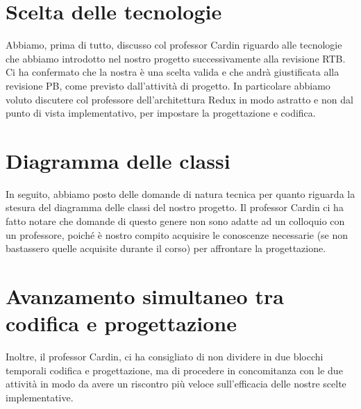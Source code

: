 \section{Scelta delle tecnologie}
Abbiamo, prima di tutto, discusso col professor Cardin riguardo alle tecnologie che abbiamo introdotto nel nostro progetto successivamente alla revisione RTB. \tabularnewline
Ci ha confermato che la nostra è una scelta valida e che andrà giustificata alla revisione PB, come previsto dall'attività di progetto. \tabularnewline
In particolare abbiamo voluto discutere col professore dell'architettura Redux in modo astratto e non dal punto di vista implementativo, per impostare la progettazione e codifica.

\section{Diagramma delle classi}
In seguito, abbiamo posto delle domande di natura tecnica per quanto riguarda la stesura del diagramma delle classi del nostro progetto. \tabularnewline
Il professor Cardin ci ha fatto notare che domande di questo genere non sono adatte ad un colloquio con un professore, poiché è nostro compito acquisire le conoscenze necessarie (se non bastassero quelle acquisite durante il corso) per affrontare la progettazione. 

\section{Avanzamento simultaneo tra codifica e progettazione}
Inoltre, il professor Cardin, ci ha consigliato di non dividere in due blocchi temporali codifica e progettazione, ma di procedere in concomitanza con le due attività in modo da avere un riscontro più veloce sull'efficacia delle nostre scelte implementative. 